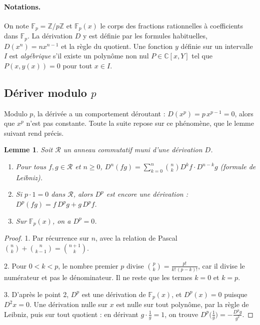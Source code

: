 \documentclass[11pt,a4paper]{article}
\theoremstyle{plain}
\newtheorem{lemme}[theoreme]{Lemme}
\theoremstyle{definition}
\theoremstyle{remark}
\newcommand{\C}{\mathbb{C}}
\newcommand{\Z}{\mathbb{Z}}
\newcommand{\F}{\mathbb{F}}
\newcommand{\Dx}{D}
\begin{document}
\paragraph{Notations.} On note $\F_p = \Z/p\Z$ et $\F_p(x)$ le corps des fractions rationnelles à coefficients dans $\F_p$. La dérivation $\Dx$ y est définie par les formules habituelles, $\Dx(x^n) = n x^{n-1}$ et la règle du quotient. Une fonction $y$ définie sur un intervalle $I$ est \emph{algébrique} s'il existe un polynôme non nul $P \in \C[x, Y]$ tel que $P(x, y(x)) = 0$ pour tout $x \in I$.

\subsection{Dériver modulo \texorpdfstring{$p$}{p}}

Modulo $p$, la dérivée a un comportement déroutant : $\Dx(x^p) = p\,x^{p-1} = 0$, alors que $x^p$ n'est pas constante. Toute la suite repose sur ce phénomène, que le lemme suivant rend précis.

\begin{lemme}\label{lem:dp}
Soit $\mathcal R$ un anneau commutatif muni d'une dérivation $\Dx$.
\begin{enumerate}[nosep]
\item Pour tous $f, g \in \mathcal R$ et $n \geq 0$, $\Dx^n(fg) = \sum_{k=0}^n \binom nk \Dx^k f \cdot \Dx^{n-k} g$ (formule de Leibniz).
\item Si $p \cdot 1 = 0$ dans $\mathcal R$, alors $\Dx^p$ est encore une dérivation : $\Dx^p(fg) = f\,\Dx^p g + g\,\Dx^p f$.
\item Sur $\F_p(x)$, on a $\Dx^p = 0$.
\end{enumerate}
\end{lemme}

\begin{proof}
1. Par récurrence sur $n$, avec la relation de Pascal $\binom nk + \binom n{k-1} = \binom{n+1}k$.

2. Pour $0 < k < p$, le nombre premier $p$ divise $\binom pk = \frac{p!}{k!\,(p-k)!}$, car il divise le numérateur et pas le dénominateur. Il ne reste que les termes $k = 0$ et $k = p$.

3. D'après le point 2, $\Dx^p$ est une dérivation de $\F_p(x)$, et $\Dx^p(x) = 0$ puisque $\Dx^2 x = 0$. Une dérivation nulle sur $x$ est nulle sur tout polynôme, par la règle de Leibniz, puis sur tout quotient : en dérivant $g \cdot \frac1g = 1$, on trouve $\Dx^p\big(\frac1g\big) = -\frac{\Dx^p g}{g^2}$.
\end{proof}
\end{document}
